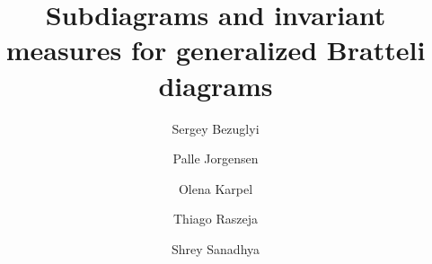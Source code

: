 \documentclass[11pt,reqno]{amsart}
\theoremstyle{definition}
\theoremstyle{remark}
\theoremstyle{plain}
\numberwithin{equation}{section}
\begin{document}
\title{Subdiagrams and invariant measures for generalized Bratteli diagrams}


\author[Bezuglyi]{Sergey Bezuglyi}
\address{Department of Mathematics, University of Iowa, Iowa City, IA 52242-1419, USA}
%
%
\author[Jorgensen]{Palle Jorgensen}
\address{Department of Mathematics, University of Iowa, Iowa City, IA 52242-1419, USA}
%
%
%
\author[Karpel]{Olena Karpel}
\address{AGH University of Krakow, Faculty of Applied Mathematics, al. Adama Mickiewicza~30, 30-059 Krak\'ow, Poland, and
B.~Verkin Institute for Low Temperature Physics and Engineering, 47~Nauky Ave., Kharkiv, 61103, Ukraine}



\author[Raszeja]{Thiago Raszeja}
%
\address{Pontifícia Universidade Católica do Rio de Janeiro, Departamento de Matemática, Rua Marquês de São Vicente, 225, Gávea - Rio de Janeiro, RJ - Brazil}

\author[Sanadhya]{Shrey Sanadhya}
\address{School of Mathematics and Statistics F07, University of Sydney, NSW 2006, Australia, and Einstein Institute of Mathematics, 
The Hebrew University of Jerusalem, 
Edmond J. Safra Campus,
Jerusalem, Israel.}



\date{}
\end{document}
